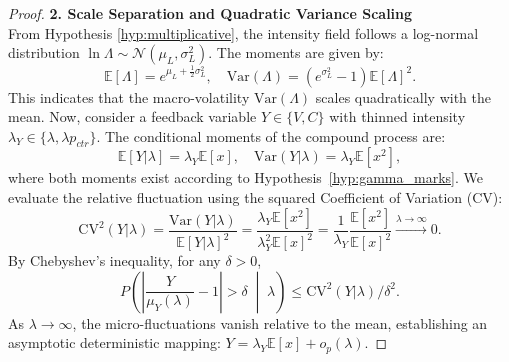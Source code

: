 \documentclass[sigconf, anonymous, review]{acmart}
\begin{document}
\begin{proof}
\textbf{2. Scale Separation and Quadratic Variance Scaling}\\
From Hypothesis \ref{hyp:multiplicative}, the intensity field follows a log-normal distribution $\ln \Lambda \sim \mathcal{N}(\mu_L, \sigma_L^2)$. The moments are given by:
\begin{equation}
    \mathbb{E}[\Lambda] = e^{\mu_L + \frac{1}{2}\sigma_L^2}, \quad \text{Var}(\Lambda) = (e^{\sigma_L^2} - 1)\mathbb{E}[\Lambda]^2.
\end{equation}
This indicates that the macro-volatility $\text{Var}(\Lambda)$ scales quadratically with the mean. Now, consider a feedback variable $Y \in \{V, C\}$ with thinned intensity $\lambda_Y \in \{\lambda, \lambda p_{ctr}\}$. The conditional moments of the compound process are:
\begin{equation}
    \mathbb{E}[Y | \lambda] = \lambda_Y \mathbb{E}[x], \quad \text{Var}(Y | \lambda) = \lambda_Y \mathbb{E}[x^2],
\end{equation}
where both moments exist according to Hypothesis~\ref{hyp:gamma_marks}.
We evaluate the relative fluctuation using the squared Coefficient of Variation (CV):
\begin{equation}
    \text{CV}^2(Y | \lambda) = \frac{\text{Var}(Y | \lambda)}{\mathbb{E}[Y | \lambda]^2} = \frac{\lambda_Y \mathbb{E}[x^2]}{\lambda_Y^2 \mathbb{E}[x]^2} = \frac{1}{\lambda_Y} \frac{\mathbb{E}[x^2]}{\mathbb{E}[x]^2} \xrightarrow{\lambda \to \infty} 0.
\end{equation}
By Chebyshev's inequality, for any $\delta > 0$, $$P\left( \left| \frac{Y}{\mu_Y(\lambda)} - 1 \right| > \delta \;\middle|\; \lambda \right) \le \text{CV}^2(Y | \lambda) / \delta^2.$$
As $\lambda \to \infty$, the micro-fluctuations vanish relative to the mean, establishing an asymptotic deterministic mapping: $Y = \lambda_Y \mathbb{E}[x] + o_p(\lambda)$.


\end{proof}
\end{document}
